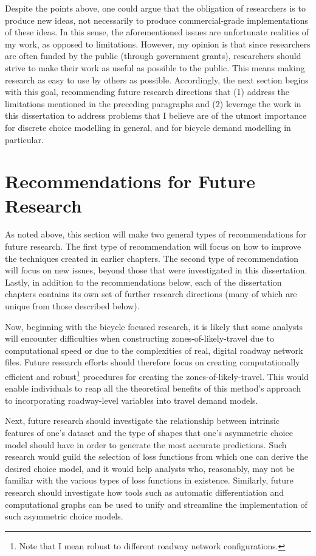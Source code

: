 Despite the points above, one could argue that the obligation of researchers is to produce new ideas, not necessarily to produce commercial-grade implementations of these ideas. In this sense, the aforementioned issues are unfortunate realities of my work, as opposed to limitations. However, my opinion is that since researchers are often funded by the public (through government grants), researchers should strive to make their work as useful as possible to the public. This means making research as easy to use by others as possible. Accordingly, the next section begins with this goal, recommending future research directions that (1) address the limitations mentioned in the preceding paragraphs and (2) leverage the work in this dissertation to address problems that I believe are of the utmost importance for discrete choice modelling in general, and for bicycle demand modelling in particular. 

\section{Recommendations for Future Research}
As noted above, this section will make two general types of recommendations for future research. The first type of recommendation will focus on how to improve the techniques created in earlier chapters. The second type of recommendation will focus on new issues, beyond those that were investigated in this dissertation. Lastly, in addition to the recommendations below, each of the dissertation chapters contains its own set of further research directions (many of which are unique from those described below).

Now, beginning with the bicycle focused research, it is likely that some analysts will encounter difficulties when constructing zones-of-likely-travel due to computational speed or due to the complexities of real, digital roadway network files. Future research efforts should therefore focus on creating computationally efficient and robust\footnote{Note that I mean robust to different roadway network configurations.} procedures for creating the zones-of-likely-travel. This would enable individuals to reap all the theoretical benefits of this method's approach to incorporating roadway-level variables into travel demand models.

Next, future research should investigate the relationship between intrinsic features of one's dataset and the type of shapes that one's asymmetric choice model should have in order to generate the most accurate predictions. Such research would guild the selection of loss functions from which one can derive the desired choice model, and it would help analysts who, reasonably, may not be familiar with the various types of loss functions in existence. Similarly, future research should investigate how tools such as automatic differentiation and computational graphs can be used to unify and streamline the implementation of such asymmetric choice models.

